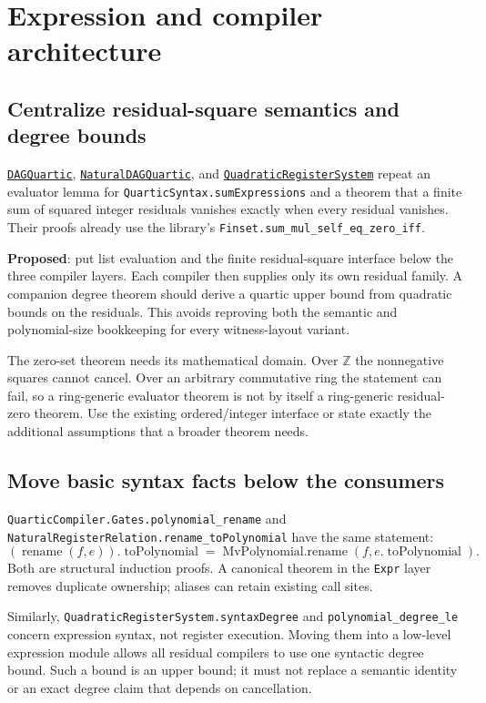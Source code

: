 \documentclass[11pt,letterpaper]{article}
\newcommand{\code}[1]{\nolinkurl{#1}}
\newcommand{\src}[1]{\href{https://github.com/VladimirReshetnikov/ProveIt/blob/60e9c5d620c6c387d932876cfa2d9376f64ea56c/Computability/DiophantineConsistency/Lean/DiophantineConsistency/#1.lean}{\texttt{#1}}}
\newcommand{\proposed}{\textbf{Proposed}}
\begin{document}
\section{Expression and compiler architecture}

\subsection{Centralize residual-square semantics and degree bounds}

\src{DAGQuartic}, \src{NaturalDAGQuartic}, and
\src{QuadraticRegisterSystem} repeat an evaluator lemma for
\code{QuarticSyntax.sumExpressions} and a theorem that a finite sum of squared
integer residuals vanishes exactly when every residual vanishes. Their proofs
already use the library's \code{Finset.sum_mul_self_eq_zero_iff}.

\proposed: put list evaluation and the finite residual-square interface below
the three compiler layers. Each compiler then supplies only its own residual
family. A companion degree theorem should derive a quartic upper bound from
quadratic bounds on the residuals. This avoids reproving both the semantic
and polynomial-size bookkeeping for every witness-layout variant.

The zero-set theorem needs its mathematical domain. Over $\mathbb Z$ the
nonnegative squares cannot cancel. Over an arbitrary commutative ring the
statement can fail, so a ring-generic evaluator theorem is not by itself a
ring-generic residual-zero theorem. Use the existing ordered/integer interface
or state exactly the additional assumptions that a broader theorem needs.

\subsection{Move basic syntax facts below the consumers}

\code{QuarticCompiler.Gates.polynomial_rename} and
\code{NaturalRegisterRelation.rename_toPolynomial} have the same statement:
\[
 (\operatorname{rename}(f,e)).\operatorname{toPolynomial}
 =\operatorname{MvPolynomial.rename}(f,e.\operatorname{toPolynomial}).
\]
Both are structural induction proofs. A canonical theorem in the \code{Expr}
layer removes duplicate ownership; aliases can retain existing call sites.

Similarly, \code{QuadraticRegisterSystem.syntaxDegree} and
\code{polynomial_degree_le} concern expression syntax, not register execution.
Moving them into a low-level expression module allows all residual compilers
to use one syntactic degree bound. Such a bound is an upper bound; it must not
replace a semantic identity or an exact degree claim that depends on cancellation.
\end{document}

